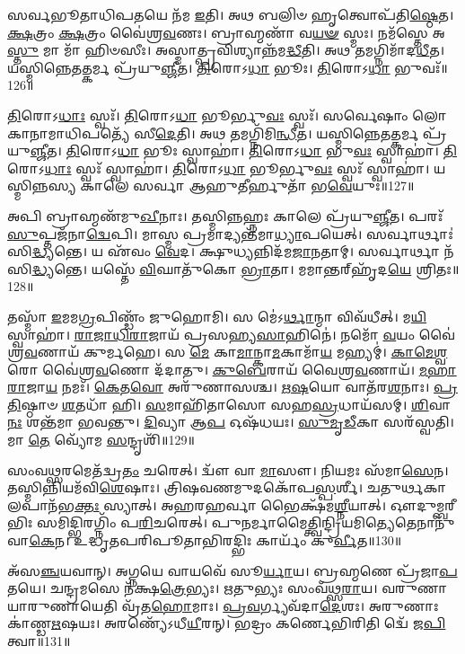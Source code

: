 𑌸𑌰𑍍𑌵𑌭𑍂𑌤𑌾𑌧𑌿𑌪𑌤𑌯𑍇 𑌨᳴𑌮 \ul{𑌇}\-𑌤𑌿। 𑌅𑌥 𑌬𑌲𑌿𑍞 𑌹𑍃𑌤𑍍𑌵𑍋𑌪᳴𑌤𑌿\-\ul{𑌷𑍍𑌠𑍇}\-𑌤। 
\-\ul{𑌕𑍍𑌷}\-𑌤𑍍𑌰𑌂 \ul{𑌕𑍍𑌷}\-𑌤𑍍𑌰𑌂 𑌵𑍈॑𑌶𑍍𑌰\-\ul{𑌵}\-𑌣𑌃। 𑌬𑍍𑌰𑌾𑌹𑍍𑌮𑌣𑌾᳴ 𑌵\-\ul{𑌯}\-\-\ul{𑍟} 𑌸𑍍𑌮𑌃। 
𑌨𑌮᳴𑌸𑍍𑌤𑍇 𑌅\-\ul{𑌸𑍍𑌤𑍁} 𑌮𑌾 𑌮𑌾᳴ 𑌹𑌿𑍞𑌸𑍀𑌃। 𑌅𑌸𑍍𑌮𑌾𑌤𑍍𑌪𑍍𑌰𑌵𑌿𑌶𑍍𑌯𑌾𑌨𑍍𑌨᳴𑌮\-\ul{𑌦𑍍𑌧𑍀}\-𑌤𑌿। 
𑌅𑌥 𑌤𑌮𑌗𑍍𑌨𑌿𑌮𑌾᳴𑌦\-\ul{𑌧𑍀}\-𑌤। 𑌯𑌸𑍍𑌮𑌿𑌨𑍍𑌨𑍇𑌤𑌤𑍍𑌕𑌰𑍍𑌮 𑌪𑍍𑌰᳴𑌯𑍁\-\ul{𑌞𑍍𑌜𑍀}\-𑌤। 
\-\ul{𑌤𑌿}\-𑌰𑍋𑌽\-\ul{𑌧𑌾} 𑌭𑍂𑌃। \ul{𑌤𑌿}\-𑌰𑍋𑌽\-\ul{𑌧𑌾} 𑌭𑍁𑌵𑌃᳴॥126॥


\-\ul{𑌤𑌿}\-𑌰𑍋𑌽\-\ul{𑌧𑌾𑌃} 𑌸𑍍𑌵𑌃᳴। \ul{𑌤𑌿}\-𑌰𑍋𑌽\-\ul{𑌧𑌾} 𑌭𑍂𑌰𑍍𑌭𑍁\-\ul{𑌵𑌃} 𑌸𑍍𑌵𑌃᳴। 
𑌸𑌰𑍍𑌵𑍇𑌷𑌾𑌂 𑌲𑍋𑌕𑌾𑌨𑌾𑌮𑌾𑌧𑌿𑌪𑌤𑍍𑌯𑍇᳴ 𑌸𑍀\-\ul{𑌦𑍇}\-𑌤𑌿। 𑌅𑌥 𑌤𑌮𑌗𑍍𑌨𑌿᳴𑌮𑌿\-\ul{𑌨𑍍𑌧𑍀}\-𑌤। 
𑌯𑌸𑍍𑌮𑌿𑌨𑍍𑌨𑍇𑌤𑌤𑍍𑌕𑌰𑍍𑌮 𑌪𑍍𑌰᳴𑌯𑍁\-\ul{𑌞𑍍𑌜𑍀}\-𑌤। \ul{𑌤𑌿}\-𑌰𑍋𑌽\-\ul{𑌧𑌾} 𑌭𑍂𑌃 𑌸𑍍𑌵𑌾𑌹𑌾॑। 
\-\ul{𑌤𑌿}\-𑌰𑍋𑌽\-\ul{𑌧𑌾} 𑌭𑍁\-\ul{𑌵𑌃} 𑌸𑍍𑌵𑌾𑌹𑌾॑। \ul{𑌤𑌿}\-𑌰𑍋𑌽\-\ul{𑌧𑌾𑌃} 𑌸𑍍𑌵𑌃᳴ 𑌸𑍍𑌵𑌾𑌹𑌾॑। 
\-\ul{𑌤𑌿}\-𑌰𑍋𑌽\-\ul{𑌧𑌾} 𑌭𑍂𑌰𑍍𑌭𑍁\-\ul{𑌵𑌃} 𑌸𑍍𑌵𑌃᳴ 𑌸𑍍𑌵𑌾𑌹𑌾॑। 
𑌯𑌸𑍍𑌮𑌿𑌨𑍍𑌨𑌸𑍍𑌯 𑌕𑌾𑌲𑍇 𑌸𑌰𑍍𑌵𑌾 𑌆𑌹𑍁𑌤𑍀𑌰𑍍\mbox{}𑌹𑍁𑌤𑌾᳴ 𑌭\-\ul{𑌵𑍇}\-𑌯𑍁𑌃॥127॥


𑌅𑌪𑌿 𑌬𑍍𑌰𑌾𑌹𑍍𑌮𑌣᳴𑌮𑍁\-\ul{𑌖𑍀}\-𑌨𑌾𑌃। 𑌤𑌸𑍍𑌮𑌿𑌨𑍍𑌨𑌹𑍍𑌨𑌃 𑌕𑌾𑌲𑍇 𑌪𑍍𑌰᳴𑌯𑍁\-\ul{𑌞𑍍𑌜𑍀}\-𑌤। 
𑌪𑌰𑌃᳴ \ul{𑌸𑍁}\-𑌪𑍍𑌤𑌜᳴𑌨𑌾\-\ul{𑌦𑍍𑌵𑍇}\-𑌪𑌿। 𑌮𑌾𑌸𑍍𑌮 𑌪𑍍𑌰𑌮𑌾𑌦𑍍𑌯𑌨𑍍𑌤᳴𑌮𑌾\-\ul{𑌧𑍍𑌯𑌾}\-𑌪𑌯𑍇𑌤𑍍। 
𑌸𑌰𑍍𑌵𑌾𑌰𑍍𑌥𑌾𑌃॑ 𑌸𑌿\-\ul{𑌦𑍍𑌧𑍍𑌯}\-𑌨𑍍𑌤𑍇। 𑌯 𑌏᳴𑌵𑌂 \ul{𑌵𑍇}\-𑌦। 
𑌕𑍍𑌷𑍁𑌧𑍍𑌯𑌨𑍍𑌨𑌿𑌦᳴𑌮\-\ul{𑌜𑌾}\-𑌨𑌤𑌾𑌮𑍍। 𑌸𑌰𑍍𑌵𑌾𑌰𑍍𑌥𑌾 𑌨᳴ 𑌸𑌿\-\ul{𑌦𑍍𑌧𑍍𑌯}\-𑌨𑍍𑌤𑍇। 
𑌯𑌸𑍍𑌤𑍇᳴ \ul{𑌵𑌿}\-𑌘𑌾𑌤𑍁᳴𑌕𑍋 \ul{𑌭𑍍𑌰𑌾}\-𑌤𑌾। 𑌮𑌮𑌾𑌨𑍍𑌤𑌰𑍍‌𑌹𑍃᳴𑌦\-\ul{𑌯𑍇} 𑌶𑍍𑌰𑌿𑌤𑌃॥128॥


𑌤𑌸𑍍𑌮𑌾᳴ \ul{𑌇}\-𑌮𑌮\-\ul{𑌗𑍍𑌰}\-𑌪𑌿𑌣𑍍𑌡𑌂᳴ 𑌜𑍁𑌹𑍋𑌮𑌿। 𑌸 𑌮𑍇॑𑌽\-\ul{𑌰𑍍𑌥𑌾}\-𑌨𑍍𑌮𑌾 𑌵𑌿𑌵᳴𑌧𑍀𑌤𑍍। 
𑌮\-\ul{𑌯𑌿} 𑌸𑍍𑌵𑌾𑌹𑌾॑। \ul{𑌰𑌾}\-\-\ul{𑌜𑌾}\-\-\ul{𑌧𑌿}\-\-\ul{𑌰𑌾}\-𑌜𑌾𑌯᳴ 𑌪𑍍𑌰𑌸𑌹𑍍𑌯\-\ul{𑌸𑌾}\-𑌹𑌿𑌨𑍇॑। 
𑌨𑌮𑍋᳴ \ul{𑌵}\-𑌯𑌂 𑌵𑍈॑𑌶𑍍𑌰\-\ul{𑌵}\-𑌣𑌾𑌯᳴ 𑌕𑍁𑌰𑍍𑌮𑌹𑍇। 𑌸 \ul{𑌮𑍇} 𑌕𑌾\-\ul{𑌮𑌾}\-𑌨𑍍𑌕𑌾\-\ul{𑌮}\-𑌕𑌾𑌮𑌾᳴\-\ul{𑌯} 𑌮𑌹𑍍𑌯𑌮𑍍‌॑। 
\-\ul{𑌕𑌾}\-\-\ul{𑌮𑍇}\-\-\ul{𑌶𑍍𑌵}\-𑌰𑍋 𑌵𑍈॑𑌶𑍍𑌰\-\ul{𑌵}\-𑌣𑍋 𑌦᳴𑌦𑌾𑌤𑍁। \ul{𑌕𑍁}\-\-\ul{𑌬𑍇}\-𑌰𑌾𑌯᳴ 𑌵𑍈𑌶𑍍𑌰\-\ul{𑌵}\-𑌣𑌾𑌯᳴। 
\-\ul{𑌮}\-\-\ul{𑌹𑌾}\-\-\ul{𑌰𑌾}\-𑌜𑌾\-\ul{𑌯} 𑌨𑌮𑌃᳴। \ul{𑌕𑍇}\-𑌤\-\ul{𑌵𑍋} 𑌅𑌰𑍁᳴𑌣𑌾𑌸𑌶𑍍𑌚। 
\-\ul{𑌋}\-\-\ul{𑌷}\-𑌯𑍋 𑌵𑌾𑌤᳴𑌰\-\ul{𑌶}\-𑌨𑌾𑌃। \ul{𑌪𑍍𑌰}\-\-\ul{𑌤𑌿}\-𑌷𑍍𑌠𑌾𑍞 \ul{𑌶}\-𑌤𑌧𑌾᳴ 𑌹𑌿। 
\-\ul{𑌸}\-𑌮𑌾𑌹𑌿᳴𑌤𑌾𑌸𑍋 𑌸𑌹\-\ul{𑌸𑍍𑌰}\-𑌧𑌾𑌯᳴𑌸𑌮𑍍। \ul{𑌶𑌿}\-𑌵𑌾 \ul{𑌨𑌃} 𑌶𑌨𑍍𑌤᳴𑌮𑌾 𑌭𑌵𑌨𑍍𑌤𑍁। 
\-\ul{𑌦𑌿}\-𑌵𑍍𑌯𑌾 𑌆\-\ul{𑌪} 𑌓𑌷᳴𑌧𑌯𑌃। \ul{𑌸𑍁}\-\-\ul{𑌮𑍃}\-\-\ul{𑌡𑍀}\-𑌕𑌾 𑌸𑌰᳴𑌸𑍍𑌵𑌤𑌿। 
𑌮𑌾 \ul{𑌤𑍇} 𑌵𑍍𑌯𑍋᳴𑌮 \ul{𑌸}\-𑌨𑍍𑌦𑍃𑌶𑌿᳴॥129॥\anuvakamend


𑌸𑌂𑌵𑌥𑍍𑌸𑌰𑌮𑍇𑌤᳴𑌦𑍍𑌵𑍍𑌰\-\ul{𑌤𑌂} 𑌚𑌰𑍇𑌤𑍍। 𑌦𑍍𑌵𑍗᳴ 𑌵𑌾 \ul{𑌮𑌾}\-𑌸𑍗। 
𑌨𑌿𑌯𑌮𑌃 𑌸᳴𑌮𑌾\-\ul{𑌸𑍇}\-𑌨। 𑌤𑌸𑍍𑌮𑌿𑌨𑍍𑌨𑌿𑌯𑌮᳴𑌵𑌿\-\ul{𑌶𑍇}\-𑌷𑌾𑌃। 
𑌤𑍍𑌰𑌿𑌷𑌵𑌣𑌮𑍁𑌦𑌕𑍋᳴𑌪\-\ul{𑌸𑍍𑌪}\-𑌰𑍍𑌶𑍀। 𑌚𑌤𑍁𑌰𑍍𑌥𑌕𑌾𑌲𑌪𑌾𑌨᳴𑌭\-\ul{𑌕𑍍𑌤𑌃} 𑌸𑍍𑌯𑌾𑌤𑍍। 
𑌅𑌹𑌰𑌹𑌰𑍍𑌵𑌾 𑌭𑍈𑌕𑍍𑌷᳴𑌮\-\ul{𑌶𑍍𑌨𑍀}\-𑌯𑌾𑌤𑍍। 𑌔𑌦𑍁𑌮𑍍𑌬𑌰𑍀𑌭𑌿𑌃 𑌸𑌮𑌿𑌦𑍍𑌭𑌿𑌰𑌗𑍍𑌨𑌿𑌂᳴ 𑌪\-\ul{𑌰𑌿}\-𑌚𑌰𑍇𑌤𑍍। 
𑌪𑍁𑌨𑌰𑍍𑌮𑌾𑌮𑍈𑌤𑍍𑌤𑍍𑌵𑌿𑌨𑍍𑌦𑍍𑌰𑌿𑌯𑌮𑌿\-𑌤𑍍𑌯𑍇𑌤𑍇𑌨𑌾𑌨𑍁᳴𑌵𑌾\-\ul{𑌕𑍇}\-𑌨। 𑌉𑌦𑍍𑌧𑍃𑌤𑌪𑌰𑌿𑌪𑍂𑌤𑌾𑌭𑌿\-𑌰𑌦𑍍𑌭𑌿𑌃 𑌕𑌾𑌰𑍍𑌯𑌂᳴ 𑌕𑍁\-\ul{𑌰𑍍𑌵𑍀}\-𑌤॥130॥


𑌅᳴𑌸\-\ul{𑌞𑍍𑌚}\-𑌯𑌵𑌾𑌨𑍍। 𑌅𑌗𑍍𑌨𑌯𑍇 𑌵𑌾𑌯𑌵𑍇᳴ 𑌸𑍂\-\ul{𑌰𑍍𑌯𑌾}\-𑌯। 
𑌬𑍍𑌰𑌹𑍍𑌮𑌣𑍇 𑌪𑍍𑌰᳴𑌜𑌾\-\ul{𑌪}\-𑌤𑌯𑍇। 𑌚𑌨𑍍𑌦𑍍𑌰𑌮𑌸𑍇 𑌨᳴𑌕𑍍𑌷\-\ul{𑌤𑍍𑌰𑍇}\-𑌭𑍍𑌯𑌃। 
𑌋𑌤𑍁𑌭𑍍𑌯𑌃 𑌸𑌂𑌵᳴𑌥𑍍𑌸\-\ul{𑌰𑌾}\-𑌯। 𑌵𑌰𑍁𑌣𑌾𑌯𑌾𑌰𑍁𑌣𑌾𑌯𑍇𑌤𑌿 𑌵𑍍𑌰᳴𑌤\-\ul{𑌹𑍋}\-𑌮𑌾𑌃। 
\-\ul{𑌪𑍍𑌰}\-\-\ul{𑌵}\-𑌰𑍍𑌗𑍍𑌯𑌵᳴𑌦𑌾\-\ul{𑌦𑍇}\-𑌶𑌃। 𑌅𑌰𑍁𑌣𑌾𑌃 𑌕𑌾॑𑌣𑍍𑌡\-\ul{𑌋}\-𑌷𑌯𑌃। 
𑌅𑌰𑌣𑍍𑌯𑍇᳴\-𑌽\-𑌧𑍀\-\-\ul{𑌯𑍀}\-𑌰𑌨𑍍। 𑌭𑌦𑍍𑌰𑌂 𑌕𑌰𑍍𑌣𑍇𑌭𑌿𑌰𑌿𑌤𑌿 𑌦𑍍𑌵𑍇᳴ 𑌜\-\ul{𑌪𑌿}\-𑌤𑍍𑌵𑌾॥131॥


